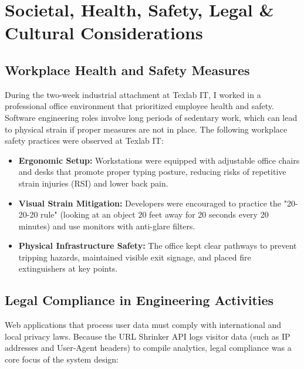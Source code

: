 \chapter{Societal, Health, Safety, Legal \& Cultural Considerations}

\section{Workplace Health and Safety Measures}
During the two-week industrial attachment at Texlab IT, I worked in a professional office environment that prioritized employee health and safety. Software engineering roles involve long periods of sedentary work, which can lead to physical strain if proper measures are not in place. The following workplace safety practices were observed at Texlab IT:
\begin{itemize}
    \item \textbf{Ergonomic Setup:} Workstations were equipped with adjustable office chairs and desks that promote proper typing posture, reducing risks of repetitive strain injuries (RSI) and lower back pain.
    \item \textbf{Visual Strain Mitigation:} Developers were encouraged to practice the "20-20-20 rule" (looking at an object 20 feet away for 20 seconds every 20 minutes) and use monitors with anti-glare filters.
    \item \textbf{Physical Infrastructure Safety:} The office kept clear pathways to prevent tripping hazards, maintained visible exit signage, and placed fire extinguishers at key points.
\end{itemize}

\section{Legal Compliance in Engineering Activities}
Web applications that process user data must comply with international and local privacy laws. Because the URL Shrinker API logs visitor data (such as IP addresses and User-Agent headers) to compile analytics, legal compliance was a core focus of the system design:

